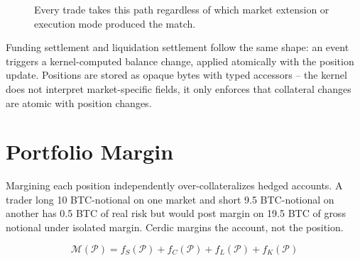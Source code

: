 \documentclass[11pt,a4paper]{article}
\begin{document}
\begin{figure}[h]
  \centering
  \caption{Every trade takes this path regardless of which market extension or execution mode produced the match.}
  \label{fig:lifecycle}
\end{figure}

Funding settlement and liquidation settlement follow the same shape: an event triggers a kernel-computed balance change, applied atomically with the position update. Positions are stored as opaque bytes with typed accessors -- the kernel does not interpret market-specific fields, it only enforces that collateral changes are atomic with position changes.

\section{Portfolio Margin}
\label{sec:margin}

Margining each position independently over-collateralizes hedged accounts. A trader long 10 BTC-notional on one market and short 9.5 BTC-notional on another has 0.5 BTC of real risk but would post margin on 19.5 BTC of gross notional under isolated margin. Cerdic margins the account, not the position.

\[
\mathcal{M}(\mathcal{P}) = f_S(\mathcal{P}) + f_C(\mathcal{P}) + f_L(\mathcal{P}) + f_K(\mathcal{P})
\]
\end{document}
